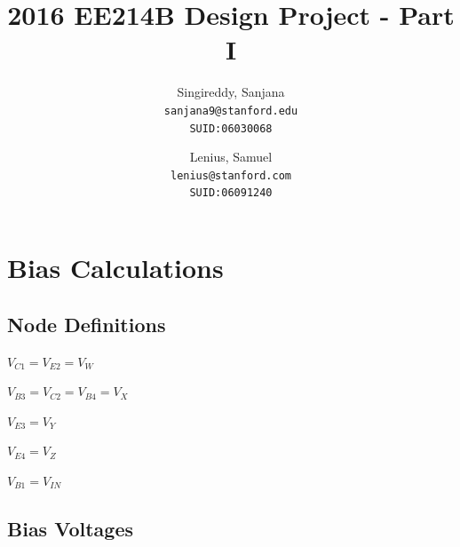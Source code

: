 \documentclass[12pt,a4paper]{article}
\begin{document}




\author{
  Singireddy, Sanjana\\
  \texttt{sanjana9@stanford.edu}\\
  \texttt{SUID:06030068}
  \and
  Lenius, Samuel\\
  \texttt{lenius@stanford.com}\\
  \texttt{SUID:06091240}
}

\title{2016 EE214B Design Project - Part I}

\maketitle

\pagebreak



\section{Bias Calculations}


\subsection{Node Definitions}
\begin{flushleft}

$V_{C1} = V_{E2} = V_{W}$

$V_{B3} = V_{C2} = V_{B4} = V_{X}$

$V_{E3} = V_{Y}$

$V_{E4} = V_{Z}$

$V_{B1} = V_{IN}$

\end{flushleft}

\subsection{Bias Voltages}
\end{document}
